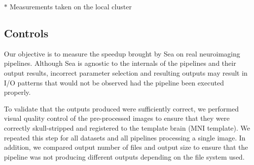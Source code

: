     \begin{table}[t]
      \small\centering
    \footnotesize{$*$ Measurements taken on the local cluster}
    \caption{Pipeline execution characteristics}\label{table:seaneuro:pipelines}
    \end{table}

    \subsection{Controls}
    Our objective is to measure the speedup brought by Sea on real neuroimaging
    pipelines. Although Sea is agnostic to the internals of the pipelines and
    their output results, incorrect parameter selection and resulting outputs
    may result in I/O patterns that would not be observed had the pipeline been
    executed properly.
    
    
    To validate that the outputs produced were sufficiently correct, we
    performed visual quality control of the pre-processed images to ensure
    that they were correctly skull-stripped and registered to the template
    brain (MNI template). We repeated this step for all datasets and all
    pipelines processing a single image. In addition, we compared output
    number of files and output size to ensure that the pipeline was not
    producing different outputs depending on the file system used.
    
